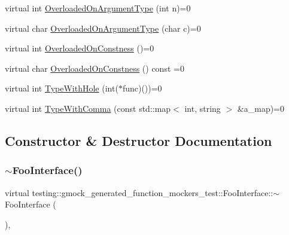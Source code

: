\begin{DoxyCompactItemize}
\item 
virtual int \hyperlink{classtesting_1_1gmock__generated__function__mockers__test_1_1_foo_interface_ad9cc9a11570403fb8378ed6620892ec6}{Overloaded\+On\+Argument\+Type} (int n)=0
\item 
virtual char \hyperlink{classtesting_1_1gmock__generated__function__mockers__test_1_1_foo_interface_a8cb6caa44216ba29fc228b016523abe9}{Overloaded\+On\+Argument\+Type} (char c)=0
\item 
virtual int \hyperlink{classtesting_1_1gmock__generated__function__mockers__test_1_1_foo_interface_afbbe6ec72ae237de05e109dea5b03f4f}{Overloaded\+On\+Constness} ()=0
\item 
virtual char \hyperlink{classtesting_1_1gmock__generated__function__mockers__test_1_1_foo_interface_ab40007385078cdb675616a21ef254df4}{Overloaded\+On\+Constness} () const =0
\item 
virtual int \hyperlink{classtesting_1_1gmock__generated__function__mockers__test_1_1_foo_interface_a9e92ef227dc68806f85ebff9c8a6102a}{Type\+With\+Hole} (int($\ast$func)())=0
\item 
virtual int \hyperlink{classtesting_1_1gmock__generated__function__mockers__test_1_1_foo_interface_a654ade1e68b5adb922149898bfe4ccda}{Type\+With\+Comma} (const std\+::map$<$ int, string $>$ \&a\+\_\+map)=0
\end{DoxyCompactItemize}


\subsection{Constructor \& Destructor Documentation}
\mbox{\label{classtesting_1_1gmock__generated__function__mockers__test_1_1_foo_interface_ad4eb4709c9ae9b1cdaded8d05567cdbb}} 
\subsubsection{\texorpdfstring{$\sim$\+Foo\+Interface()}{~FooInterface()}}
{\footnotesize\ttfamily virtual testing\+::gmock\+\_\+generated\+\_\+function\+\_\+mockers\+\_\+test\+::\+Foo\+Interface\+::$\sim$\+Foo\+Interface (\begin{DoxyParamCaption}{ }\end{DoxyParamCaption})\hspace{0.3cm}{\ttfamily [inline]}, {\ttfamily [virtual]}}



